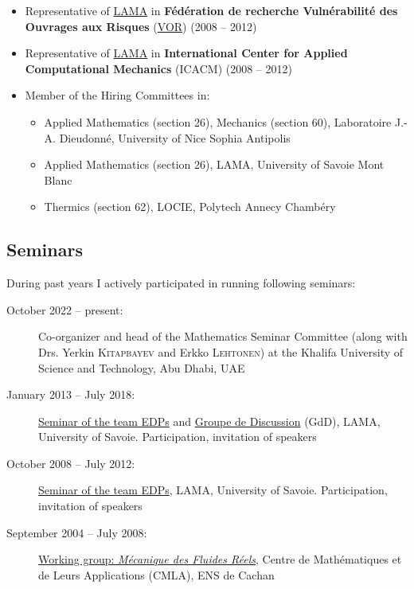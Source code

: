 \documentclass[final, a4paper, oneside, 12pt]{article}
\numberwithin{equation}{section}
\begin{document}
\begin{itemize}
  \item Representative of \href{https://www.lama.univ-savoie.fr/}{LAMA} in \textbf{F\'ed\'eration de recherche Vuln\'erabilit\'e des Ouvrages aux Risques} (\href{http://vor.grenoble-inp.fr}{VOR}) (2008 -- 2012)
  
  \item Representative of \href{https://www.lama.univ-savoie.fr/}{LAMA} in \textbf{International Center for Applied Computational Mechanics} (ICACM) (2008 -- 2012)
  
  \item Member of the Hiring Committees in:
  \begin{itemize}
    \item Applied Mathematics (section 26), Mechanics (section 60), Laboratoire J.-A. Dieudonn\'e, University of Nice Sophia Antipolis
    \item Applied Mathematics (section 26), LAMA, University of Savoie Mont Blanc
    \item Thermics (section 62), LOCIE, Polytech Annecy Chamb\'ery
  \end{itemize}

\end{itemize}

\subsection{Seminars}

During past years I actively participated in running following seminars:

\begin{description}
  
  \item[October 2022 -- present:] Co-organizer and head of the Mathematics Seminar Committee (along with Drs. Yerkin \textsc{Kitapbayev} and Erkko \textsc{Lehtonen}) at the Khalifa University of Science and Technology, Abu Dhabi, UAE

  \item[January 2013 -- July 2018:] \href{http://www.lama.univ-savoie.fr/index.php?use=seminaires&equipe=edp&lang=en}{Seminar of the team EDPs} and \href{https://www.lama.univ-savoie.fr/~garnier/fr.GdD_EDP2.html}{Groupe de Discussion} (GdD), LAMA, University of Savoie. Participation, invitation of speakers
  
  \item[October 2008 -- July 2012:] \href{http://www.lama.univ-savoie.fr/index.php?use=seminaires&equipe=edp&lang=en}{Seminar of the team EDPs}, LAMA, University of Savoie. Participation, invitation of speakers
  
  \item[September 2004 -- July 2008:] \href{http://www.cmla.ens-cachan.fr/la-recherche/groupes-de-travail/gdtmf.html}{Working group: \textit{M\'ecanique des Fluides R\'eels}}, Centre de Math\'ematiques et de Leurs Applications (CMLA), ENS de Cachan

\end{description}
\end{document}

